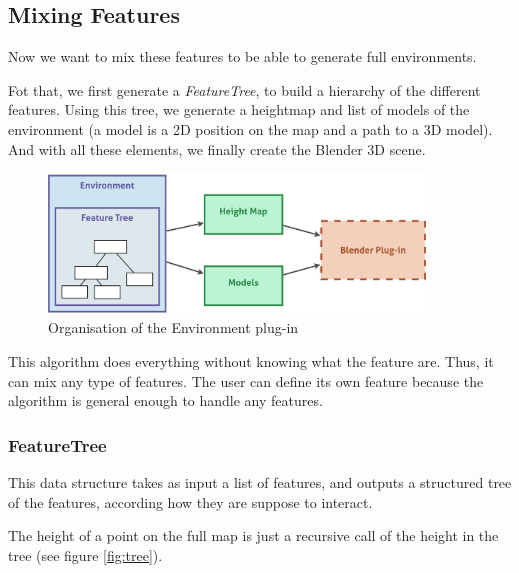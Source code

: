 

\subsection{Mixing Features}
Now we want to mix these features to be able to generate full environments.

Fot that, we first generate a \textit{FeatureTree}, to build a hierarchy of the different features. Using this tree, we generate a heightmap and list of models of the environment (a model is a 2D position on the map and a path to a 3D model). And with all these elements, we finally create the Blender 3D scene.

\begin{figure}[h]
  \begin{center}
    \includegraphics[width=10cm]{img/env_global.pdf}
    \caption{Organisation of the Environment plug-in}
    \label{fig:env_global}
  \end{center}
\end{figure}

This algorithm does everything without knowing what the feature are. Thus, it can mix any type of features. The user can define its own feature because the algorithm is general enough to handle any features.


\subsubsection{FeatureTree}
This data structure takes as input a list of features, and outputs a structured tree of the features, according how they are suppose to interact. 

The height of a point on the full map is just a recursive call of the height in the tree (see figure \ref{fig:tree}).

